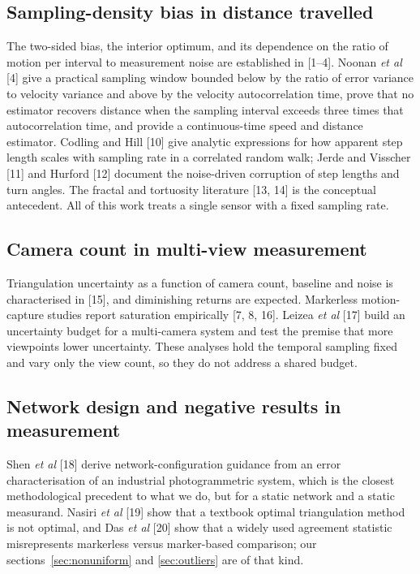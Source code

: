 \documentclass{iopjournal}
\begin{document}
\subsection{Sampling-density bias in distance travelled}
The two-sided bias, the interior optimum, and its dependence on the ratio of
motion per interval to measurement noise are established in [1--4]. Noonan
\textit{et al} [4] give a practical sampling window bounded below by the ratio
of error variance to velocity variance and above by the velocity
autocorrelation time, prove that no estimator recovers distance when the
sampling interval exceeds three times that autocorrelation time, and provide a
continuous-time speed and distance estimator. Codling and Hill [10] give
analytic expressions for how apparent step length scales with sampling rate in
a correlated random walk; Jerde and Visscher [11] and Hurford [12] document
the noise-driven corruption of step lengths and turn angles. The fractal and
tortuosity literature [13, 14] is the conceptual antecedent. All of this work
treats a single sensor with a fixed sampling rate.

\subsection{Camera count in multi-view measurement}
Triangulation uncertainty as a function of camera count, baseline and noise is
characterised in [15], and diminishing returns are expected. Markerless
motion-capture studies report saturation empirically [7, 8, 16]. Leizea
\textit{et al} [17] build an uncertainty budget for a multi-camera system and
test the premise that more viewpoints lower uncertainty. These analyses hold
the temporal sampling fixed and vary only the view count, so they do not
address a shared budget.

\subsection{Network design and negative results in measurement}
Shen \textit{et al} [18] derive network-configuration guidance from an error
characterisation of an industrial photogrammetric system, which is the closest
methodological precedent to what we do, but for a static network and a static
measurand. Nasiri \textit{et al} [19] show that a textbook optimal
triangulation method is not optimal, and Das \textit{et al} [20] show that a
widely used agreement statistic misrepresents markerless versus marker-based
comparison; our sections~\ref{sec:nonuniform} and \ref{sec:outliers} are of
that kind.
\end{document}
